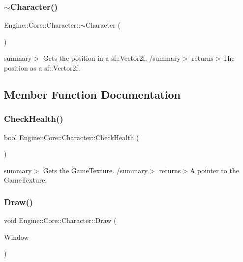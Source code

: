 \subsubsection{\texorpdfstring{$\sim$\+Character()}{~Character()}}
{\footnotesize\ttfamily Engine\+::\+Core\+::\+Character\+::$\sim$\+Character (\begin{DoxyParamCaption}{ }\end{DoxyParamCaption})}

summary$>$ Gets the position in a sf\+::\+Vector2f. /summary$>$ returns$>$The position as a sf\+::\+Vector2f.

\subsection{Member Function Documentation}
\mbox{\label{class_engine_1_1_core_1_1_character_ad32924505f5bc7761590ecbfd06e6f09}} 
\subsubsection{\texorpdfstring{Check\+Health()}{CheckHealth()}}
{\footnotesize\ttfamily bool Engine\+::\+Core\+::\+Character\+::\+Check\+Health (\begin{DoxyParamCaption}\item[{void}]{ }\end{DoxyParamCaption})}

summary$>$ Gets the Game\+Texture. /summary$>$ returns$>$A pointer to the Game\+Texture.\mbox{\label{class_engine_1_1_core_1_1_character_ae25a76e7497eeb6dbd1ad3b72c1ff721}} 
\subsubsection{\texorpdfstring{Draw()}{Draw()}}
{\footnotesize\ttfamily void Engine\+::\+Core\+::\+Character\+::\+Draw (\begin{DoxyParamCaption}\item[{Render\+Window $\ast$}]{Window }\end{DoxyParamCaption})}


